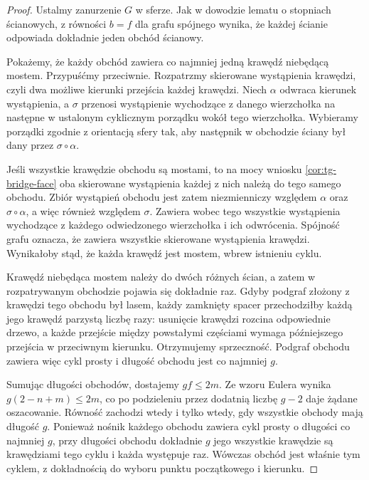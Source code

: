 \begin{proof}
Ustalmy zanurzenie $G$ w sferze. Jak w dowodzie
lematu o stopniach ścianowych, z równości $b=f$
dla grafu spójnego wynika, że każdej ścianie
odpowiada dokładnie jeden obchód ścianowy.

Pokażemy, że każdy obchód zawiera co najmniej jedną
krawędź niebędącą mostem. Przypuśćmy przeciwnie.
Rozpatrzmy skierowane wystąpienia krawędzi,
czyli dwa możliwe kierunki przejścia każdej krawędzi.
Niech $\alpha$ odwraca kierunek wystąpienia, a $\sigma$
przenosi wystąpienie wychodzące z danego wierzchołka
na następne w ustalonym cyklicznym porządku
wokół tego wierzchołka. Wybieramy porządki zgodnie
z orientacją sfery tak, aby następnik w obchodzie
ściany był dany przez $\sigma\circ\alpha$.

Jeśli wszystkie krawędzie obchodu są mostami,
to na mocy wniosku \ref{cor:tg-bridge-face} oba
skierowane wystąpienia każdej z nich należą do
tego samego obchodu. Zbiór wystąpień obchodu jest
zatem niezmienniczy względem $\alpha$ oraz
$\sigma\circ\alpha$, a więc również względem $\sigma$.
Zawiera wobec tego wszystkie wystąpienia wychodzące
z każdego odwiedzonego wierzchołka i ich odwrócenia.
Spójność grafu oznacza, że zawiera wszystkie
skierowane wystąpienia krawędzi. Wynikałoby stąd,
że każda krawędź jest mostem, wbrew istnieniu cyklu.

Krawędź niebędąca mostem należy do dwóch różnych
ścian, a zatem w rozpatrywanym obchodzie pojawia się
dokładnie raz. Gdyby podgraf złożony z krawędzi
tego obchodu był lasem, każdy zamknięty spacer
przechodziłby każdą jego krawędź parzystą liczbę razy:
usunięcie krawędzi rozcina odpowiednie drzewo,
a każde przejście między powstałymi częściami wymaga
późniejszego przejścia w przeciwnym kierunku.
Otrzymujemy sprzeczność. Podgraf obchodu zawiera więc
cykl prosty i długość obchodu jest co najmniej $g$.

Sumując długości obchodów, dostajemy $gf\leq2m$.
Ze wzoru Eulera wynika $g(2-n+m)\leq2m$,
co po podzieleniu przez dodatnią liczbę $g-2$
daje żądane oszacowanie. Równość zachodzi wtedy
i tylko wtedy, gdy wszystkie obchody mają długość $g$.
Ponieważ nośnik każdego obchodu zawiera cykl prosty
o długości co najmniej $g$, przy długości obchodu
dokładnie $g$ jego wszystkie krawędzie są krawędziami
tego cyklu i każda występuje raz. Wówczas obchód
jest właśnie tym cyklem, z dokładnością do wyboru
punktu początkowego i kierunku.
\end{proof}

